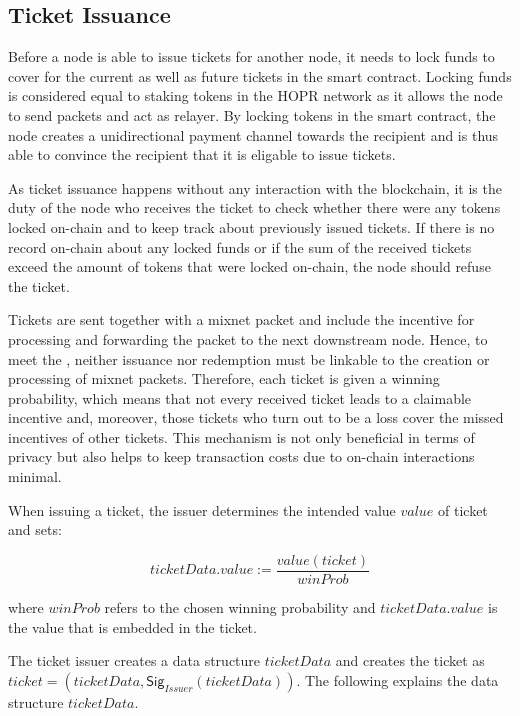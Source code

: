 \subsection{Ticket Issuance}
\label{sec:tickets:issuance}

Before a node is able to issue tickets for another node, it needs to lock funds to cover for the current as well as future tickets in the smart contract. Locking funds is considered equal to staking tokens in the HOPR network as it allows the node to send packets and act as relayer. By locking tokens in the smart contract, the node creates a unidirectional payment channel towards the recipient and is thus able to convince the recipient that it is eligable to issue tickets.

As ticket issuance happens without any interaction with the blockchain, it is the duty of the node who receives the ticket to check whether there were any tokens locked on-chain and to keep track about previously issued tickets. If there is no record on-chain about any locked funds or if the sum of the received tickets exceed the amount of tokens that were locked on-chain, the node should refuse the ticket.

Tickets are sent together with a mixnet packet and include the incentive for processing and forwarding the packet to the next downstream node. Hence, to meet the , neither issuance nor redemption must be linkable to the creation or processing of mixnet packets. Therefore, each ticket is given a winning probability, which means that not every received ticket leads to a claimable incentive and, moreover, those tickets who turn out to be a loss cover the missed incentives of other tickets. This mechanism is not only beneficial in terms of privacy but also helps to keep transaction costs due to on-chain interactions minimal.

When issuing a ticket, the issuer determines the intended value $value$ of ticket and sets:

$$ ticketData.value := \frac{value(ticket)}{winProb} $$

where $winProb$ refers to the chosen winning probability and $ticketData.value$ is the value that is embedded in the ticket.

The ticket issuer creates a data structure $ticketData$ and creates the ticket as $ticket = (ticketData,\mathsf{Sig}_{Issuer}(ticketData))$. The following explains the data structure $ticketData$.

